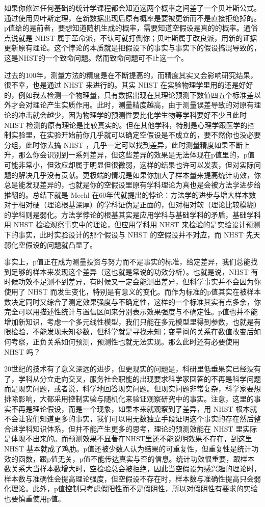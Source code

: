 \documentclass[]{book}
\begin{document}
如果你修过任何基础的统计学课程都会知道这两个概率之间差了一个贝叶斯公式。通过使用贝叶斯定理，在新数据出现后原有概率是要被更新而不是直接拒绝掉的。p值给的是前者，要想知道随机生成的概率，需要知道空假设是真的的概率。通俗点说就是 NHST 属于革命派，不认可就打倒你；贝叶斯属于改良派，用新的证据更新原有理论。这个悖论的本质就是把假设下的事实与事实下的假设搞混导致的，这是NHST的一个致命问题。然而致命问题可不止这一个。

过去的100年，测量方法的精度是在不断提高的，而精度其实又会影响研究结果，很不幸，也是通过 NHST 来进行的。其实 NHST 在实验物理学里用的还是好好的，例如我去检测一个物理量，只有数据出现在其理论预测下数值四五个标准差以外才会对理论产生实质作用。此时，测量精度越高，由于测量误差导致的对原有理论的冲击就会越少，因为物理学的预测性要比化学生物等学科要好不少且此时 NHST 检测的原有理论是比较真实的。但在其他学科，特别是心理学跟医学的控制实验里，在实验开始前你几乎就可以确定空假设是不成立的，要不然你也没必要分组，此时你去搞 NHST ，几乎一定可以找到差异，此时测量精度如果不断上升，那么你会识别到一系列差异，但这些差异的效果是无法体现在p值里的，p值可能非常小，但效应却属于明显但很微弱，这样的结果也许可以发表，但对实际问题的解决几乎没有贡献。更极端的情况是如果你加大了样本量来提高统计功效，你总是能发现差异的，也就是你的空假设里原有学科理论为真也是会被方法学进步给推翻的。总结下就是 Meehl 在60年代就提出的悖论：方法学的进步与增大样本数对于相对硬（理论根基深厚）的学科证伪是正面的，但对相对软（理论比较模糊）的学科则是弱化。方法学悖论的根基其实是应用学科与基础学科的矛盾，基础学科用 NHST 检验观察事实中的理论，但应用学科用 NHST 来检验的是实验设计预测下的事实，此时实验设计的那个假设与 NHST 的空假设并不对应，而 NHST 先天弱化空假设的问题就凸显了。

事实上，p值正在成为测量投资与努力而不是事实的标准，给定差异，我们总能找到足够的样本来发现这个差异（这也就是常说的功效分析）。也就是说，NHST 有时候功效不足测不到差异，有时候又一定会能测出差异，但科学事实并不会因为你使用了 NHST 而发生变化，特别是有意义的变化。而作为标准的p值其实在被样本数决定同时又综合了测定效果强度与不确定性，这样的一个标准其实有点多余，你完全可以用描述性统计与置信区间来分别表示效果强度与不确定性。p值也并不能增加新知识，考虑一个多元线性模型，我们只能在多元模型里得到参数，也就是有限检验，不能发现未知参数，但科学就是寻找未知；变量间的关系在数值改变后如何考察，正负关系如何预测，预测性也就无法实现。那么此时还有必要使用 NHST 吗？

20世纪的技术有了意义深远的进步，但更现实的问题是，科研里低垂果实已经没有了，学科从分立走向交叉，服务社会职能的出现要求科学家回答的不再是科学问题而是现实问题，或者说，科学地回答现实问题。但现实问题非常复杂，科学家要想排除影响，大都采用控制实验与随机化来验证观察研究中的事实。注意，这里的事实不再是理论假设，而是一个现象，如果本来就观察到了差异，用 NHST 根本就不会让我们知道更多的事实，我们可以用无数独立手段证明这个事实的存在然后整合进学科知识体系，但并不能产生更多的思考，理论的预测效能在 NHST 里实际是体现不出来的。而预测效果不显著在NHST里还不能说明效果不存在，到这里 NHST 基本就成了鸡肋。p值还被少数人认为结果的可重复性，但重复性是统计功效的函数，跟p值无关，p值不能传达真实与否的信息。统计功效很重要，跟样本数关系大当样本数增大时，空检验总会被拒绝，因此当空假设为感兴趣的理论时，样本数与准确性会提高理论强度，但空假设不存在时，样本数与准确性提高只会弱化理论。此外，p值控制只考虑假阳性而不是假阴性，所以对假阴性有要求的实验也要慎重使用p值。
\end{document}
